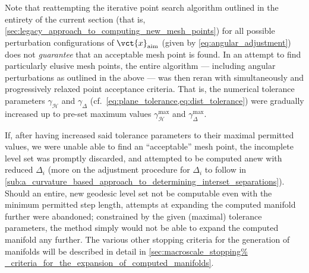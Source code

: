 Note that reattempting the iterative point search algorithm outlined in
the entirety of the current section (that is,
\cref{sec:legacy_approach_to_computing_new_mesh_points}) for all possible
perturbation configurations of $\vct{x}_{\text{aim}}$ (given by
\cref{eq:angular_adjustment}) does not \emph{guarantee} that an
acceptable mesh point is found. In an attempt to find particularly elusive mesh
points, the entire algorithm --- including angular perturbations as outlined in
the above --- was then reran with simultaneously and progressively relaxed
point acceptance criteria. That is, the numerical tolerance parameters
$\gamma_{\mathcal{H}}$ and $\gamma_{\Delta}$ (cf.\
\cref{eq:plane_tolerance,eq:dist_tolerance}) were gradually increased up to
pre-set maximum values $\gamma_{\mathcal{H}}^{\max}$ and
$\gamma_{\Delta}^{\max}$.

If, after having increased said tolerance parameters to their maximal
permitted values, we were unable able to find an ``acceptable'' mesh point, the
incomplete level set was promptly discarded, and attempted to be computed
anew with reduced $\Delta_{i}$ (more on the adjustment procedure for
$\Delta_{i}$ to follow in
\cref{sub:a_curvature_based_approach_to_determining_interset_separations}).
Should an entire, new geodesic level set not be computable even with the
minimum permitted step length, attempts at expanding the computed manifold
further were abandoned; constrained by the given (maximal) tolerance
parameters, the method simply would not be able to expand the computed manifold
any further. The various other stopping criteria for the generation of
manifolds will be described in detail in \cref{sec:macroscale_stopping%
_criteria_for_the_expansion_of_computed_manifolds}.
